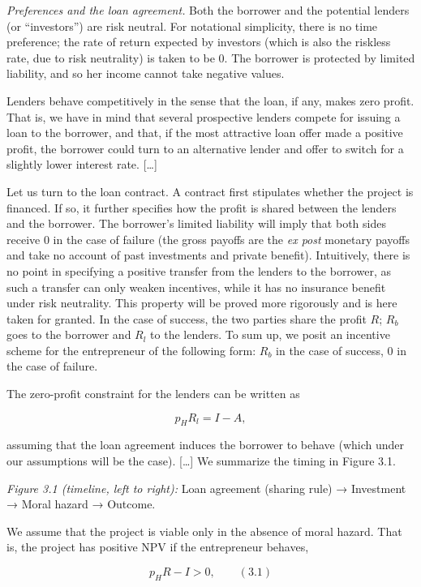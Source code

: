 \documentclass[11pt,a4paper]{article}
\begin{document}
\emph{Preferences and the loan agreement.} Both the borrower and the potential lenders (or
``investors'') are risk neutral. For notational simplicity, there is no time preference; the rate of
return expected by investors (which is also the riskless rate, due to risk neutrality) is taken to
be 0. The borrower is protected by limited liability, and so her income cannot take negative values.

Lenders behave competitively in the sense that the loan, if any, makes zero profit. That is, we have
in mind that several prospective lenders compete for issuing a loan to the borrower, and that, if
the most attractive loan offer made a positive profit, the borrower could turn to an alternative
lender and offer to switch for a slightly lower interest rate. {[}\ldots{]}

Let us turn to the loan contract. A contract first stipulates whether the project is financed. If
so, it further specifies how the profit is shared between the lenders and the borrower. The
borrower's limited liability will imply that both sides receive 0 in the case of failure (the gross
payoffs are the \emph{ex post} monetary payoffs and take no account of past investments and private
benefit). Intuitively, there is no point in specifying a positive transfer from the lenders to the
borrower, as such a transfer can only weaken incentives, while it has no insurance benefit under
risk neutrality. This property will be proved more rigorously and is here taken for granted. In the
case of success, the two parties share the profit \(R\); \(R_b\) goes to the borrower and \(R_l\) to
the lenders. To sum up, we posit an incentive scheme for the entrepreneur of the following form:
\(R_b\) in the case of success, 0 in the case of failure.

The zero-profit constraint for the lenders can be written as

\[p_H R_l = I - A,\]

assuming that the loan agreement induces the borrower to behave (which under our assumptions will be
the case). {[}\ldots{]} We summarize the timing in Figure 3.1.

\emph{Figure 3.1 (timeline, left to right):} Loan agreement (sharing rule) → Investment → Moral
hazard → Outcome.

We assume that the project is viable only in the absence of moral hazard. That is, the project has
positive NPV if the entrepreneur behaves,

\[p_H R - I > 0, \qquad (3.1)\]
\end{document}
